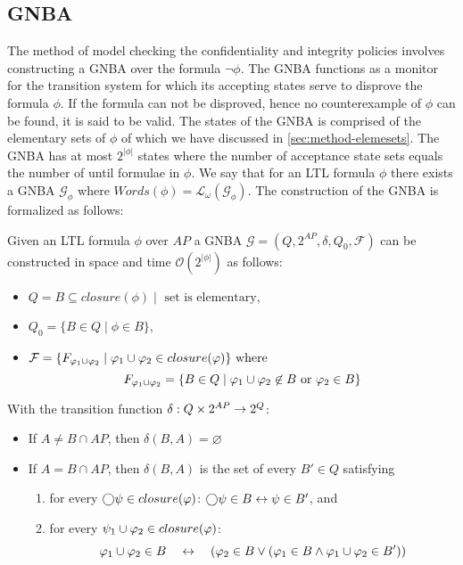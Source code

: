 \subsection{GNBA}
The method of model checking the confidentiality and integrity policies involves constructing a GNBA over the formula $\lnot\phi$. The GNBA functions as a monitor for the transition system for which its accepting states serve to disprove the formula $\phi$. If the formula can not be disproved, hence no counterexample of $\phi$ can be found, it is said to be valid. The states of the GNBA is comprised of the elementary sets of $\phi$ of which we have discussed in \autoref{sec:method-elemesets}. The GNBA has at most $2^{|\phi|}$ states where the number of acceptance state sets equals the number of until formulae in $\phi$. We say that for an LTL formula $\phi$ there exists a GNBA $\mathcal{G_\phi}$ where $Words(\phi)=\mathcal{L}_\omega(\mathcal{G_\phi})$. The construction of the GNBA is formalized as follows:
\begin{definition}
\label{def:ltl-to-gnba}
Given an LTL formula $\phi$ over $AP$ a GNBA $\mathcal{G}=(Q,2^{AP},\delta,Q_0,\mathcal{F})$ can be constructed in space and time $\mathcal{O}(2^{|\phi|})$ as follows:
\begin{itemize}
    \item $Q = B \subseteq closure(\phi) \mid \text{ set is elementary}$,
    \item $Q_0 = \{ B \in Q \mid \phi \in B \}$,
    \item $\mathcal{F} = \{F_{\varphi_1 \cup \varphi_2} \mid \varphi_1 \cup \varphi_2 \in closure(\varphi)\} \text{ where }$
    \begin{equation*}
        F_{\varphi_1 \cup \varphi_2} = \{B \in Q \mid \varphi_1 \cup \varphi_2 \not\in B \text{ or } \varphi_2 \in B\}
    \end{equation*}
\end{itemize}
With the transition function $\delta : Q \times 2^{AP} \rightarrow 2^Q$:
\begin{itemize}
    \item If $A \neq B \cap AP$, then $\delta(B,A)=\varnothing$
    \item If $A = B \cap AP$, then $\delta(B,A)$ is the set of every $B'\in Q$ satisfying
    \begin{enumerate}
        \item for every $\bigcirc\psi \in closure(\varphi)$: $\bigcirc\psi \in B \leftrightarrow \psi \in B'$, and
        \item for every $\psi_1 \cup \varphi_2 \in closure(\varphi)$:
        \begin{equation*}
            \varphi_1 \cup \varphi_2 \in B \quad\leftrightarrow\quad (\varphi_2 \in B \lor (\varphi_1 \in B \land \varphi_1 \cup \varphi_2 \in B'))
        \end{equation*}
    \end{enumerate}
\end{itemize}
\end{definition}


